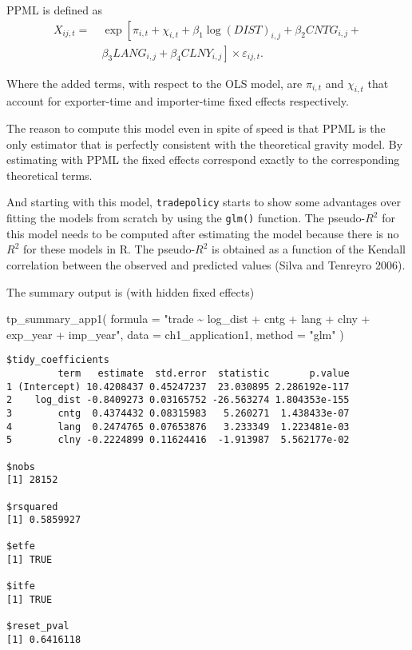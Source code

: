 \documentclass[12pt,reqno,oneside,pdftex]{formato-puc/puctesis} %
\newenvironment{Shaded}{\begin{snugshade}}{\end{snugshade}}
\newcommand{\AttributeTok}[1]{\textcolor[rgb]{0.77,0.63,0.00}{#1}}
\newcommand{\FunctionTok}[1]{\textcolor[rgb]{0.00,0.00,0.00}{#1}}
\newcommand{\NormalTok}[1]{#1}
\newcommand{\StringTok}[1]{\textcolor[rgb]{0.31,0.60,0.02}{#1}}
\begin{document}
PPML is defined as \begin{align}
X_{ij,t} =& \:\exp\left[\pi_{i,t} + \chi_{i,t} + \beta_1 \log(DIST)_{i,j} + \beta_2 CNTG_{i,j} +\right.\\
\text{ }& \:\left.\beta_3 LANG_{i,j} + \beta_4 CLNY_{i,j}\right] \times \varepsilon_{ij,t}.
\end{align}

Where the added terms, with respect to the OLS model, are \(\pi_{i,t}\)
and \(\chi_{i,t}\) that account for exporter-time and importer-time
fixed effects respectively.

The reason to compute this model even in spite of speed is that PPML is
the only estimator that is perfectly consistent with the theoretical
gravity model. By estimating with PPML the fixed effects correspond
exactly to the corresponding theoretical terms.

And starting with this model, \texttt{tradepolicy} starts to show some
advantages over fitting the models from scratch by using the
\texttt{glm()} function. The pseudo-\(R^2\) for this model needs to be
computed after estimating the model because there is no \(R^2\) for
these models in R. The pseudo-\(R^2\) is obtained as a function of the
Kendall correlation between the observed and predicted values (Silva and
Tenreyro 2006).

The summary output is (with hidden fixed effects)

\begin{Shaded}
\begin{Highlighting}[]
\FunctionTok{tp\_summary\_app1}\NormalTok{(}
  \AttributeTok{formula =} \StringTok{"trade \textasciitilde{} log\_dist + cntg + lang + clny + exp\_year + imp\_year"}\NormalTok{,}
  \AttributeTok{data =}\NormalTok{ ch1\_application1,}
  \AttributeTok{method =} \StringTok{"glm"}
\NormalTok{)}
\end{Highlighting}
\end{Shaded}

\begin{verbatim}
$tidy_coefficients
         term   estimate  std.error  statistic       p.value
1 (Intercept) 10.4208437 0.45247237  23.030895 2.286192e-117
2    log_dist -0.8409273 0.03165752 -26.563274 1.804353e-155
3        cntg  0.4374432 0.08315983   5.260271  1.438433e-07
4        lang  0.2474765 0.07653876   3.233349  1.223481e-03
5        clny -0.2224899 0.11624416  -1.913987  5.562177e-02

$nobs
[1] 28152

$rsquared
[1] 0.5859927

$etfe
[1] TRUE

$itfe
[1] TRUE

$reset_pval
[1] 0.6416118
\end{verbatim}
\end{document}
